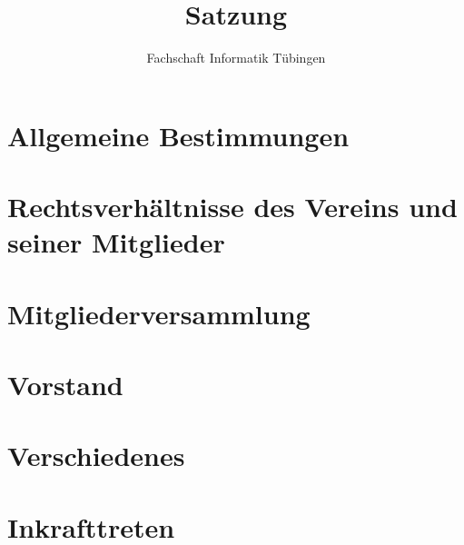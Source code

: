 \documentclass[a4paper, 12pt, german, oneside]{scrreprt}
\title{Satzung}
\subtitle{Fachschaft Informatik Tübingen}
\begin{document}
\maketitle
\tableofcontents
\newpage

\setlength{\parindent}{0pt}
\setlength{\parskip}{1ex plus 0.5ex minus 0.2ex}




\chapter{Allgemeine Bestimmungen}


\chapter{Rechtsverhältnisse des Vereins und seiner Mitglieder}


\chapter{Mitgliederversammlung}


\chapter{Vorstand}


\chapter{Verschiedenes}


\chapter*{Inkrafttreten}

\end{document}
